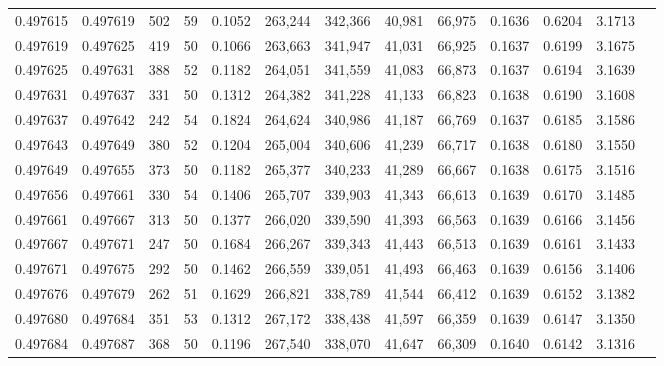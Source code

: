 \begin{tabular}{rrrrrrrrrrrrr}
0.497615 & 0.497619 & 502 &  59 &                                     0.1052 & 263,244 & 342,366 &  40,981 &  66,975 & 0.1636 & 0.6204 & 3.1713 \\
0.497619 & 0.497625 & 419 &  50 &                                     0.1066 & 263,663 & 341,947 &  41,031 &  66,925 & 0.1637 & 0.6199 & 3.1675 \\
0.497625 & 0.497631 & 388 &  52 &                                     0.1182 & 264,051 & 341,559 &  41,083 &  66,873 & 0.1637 & 0.6194 & 3.1639 \\
0.497631 & 0.497637 & 331 &  50 &                                     0.1312 & 264,382 & 341,228 &  41,133 &  66,823 & 0.1638 & 0.6190 & 3.1608 \\
0.497637 & 0.497642 & 242 &  54 &                                     0.1824 & 264,624 & 340,986 &  41,187 &  66,769 & 0.1637 & 0.6185 & 3.1586 \\
0.497643 & 0.497649 & 380 &  52 &                                     0.1204 & 265,004 & 340,606 &  41,239 &  66,717 & 0.1638 & 0.6180 & 3.1550 \\
0.497649 & 0.497655 & 373 &  50 &                                     0.1182 & 265,377 & 340,233 &  41,289 &  66,667 & 0.1638 & 0.6175 & 3.1516 \\
0.497656 & 0.497661 & 330 &  54 &                                     0.1406 & 265,707 & 339,903 &  41,343 &  66,613 & 0.1639 & 0.6170 & 3.1485 \\
0.497661 & 0.497667 & 313 &  50 &                                     0.1377 & 266,020 & 339,590 &  41,393 &  66,563 & 0.1639 & 0.6166 & 3.1456 \\
0.497667 & 0.497671 & 247 &  50 &                                     0.1684 & 266,267 & 339,343 &  41,443 &  66,513 & 0.1639 & 0.6161 & 3.1433 \\
0.497671 & 0.497675 & 292 &  50 &                                     0.1462 & 266,559 & 339,051 &  41,493 &  66,463 & 0.1639 & 0.6156 & 3.1406 \\
0.497676 & 0.497679 & 262 &  51 &                                     0.1629 & 266,821 & 338,789 &  41,544 &  66,412 & 0.1639 & 0.6152 & 3.1382 \\
0.497680 & 0.497684 & 351 &  53 &                                     0.1312 & 267,172 & 338,438 &  41,597 &  66,359 & 0.1639 & 0.6147 & 3.1350 \\
0.497684 & 0.497687 & 368 &  50 &                                     0.1196 & 267,540 & 338,070 &  41,647 &  66,309 & 0.1640 & 0.6142 & 3.1316 \\

\end{tabular}
